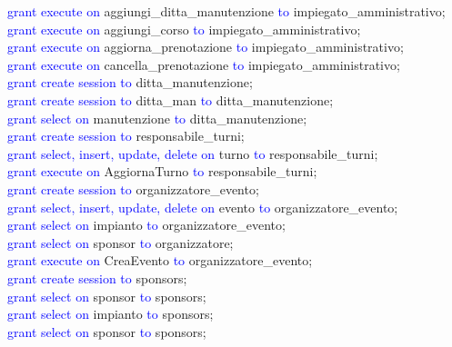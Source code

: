 \documentclass{article}
\begin{document}
\begin{flushleft}
        \textcolor{blue}{grant execute on} aggiungi\_ditta\_manutenzione \textcolor{blue}{to} impiegato\_amministrativo; \\
        \textcolor{blue}{grant execute on} aggiungi\_corso \textcolor{blue}{to} impiegato\_amministrativo; \\
        \textcolor{blue}{grant execute on} aggiorna\_prenotazione \textcolor{blue}{to} impiegato\_amministrativo; \\
        \textcolor{blue}{grant execute on} cancella\_prenotazione \textcolor{blue}{to} impiegato\_amministrativo; \\
        \vspace{2mm}
        \textcolor{blue}{grant create session to} ditta\_manutenzione; \\
        \textcolor{blue}{grant create session to} ditta\_man \textcolor{blue}{to} ditta\_manutenzione; \\
        \textcolor{blue}{grant select on} manutenzione \textcolor{blue}{to} ditta\_manutenzione; \\
        \vspace{2mm}
        \textcolor{blue}{grant create session to} responsabile\_turni; \\
        \textcolor{blue}{grant select, insert, update, delete on} turno \textcolor{blue}{to} responsabile\_turni; \\
        \textcolor{blue}{grant execute on} AggiornaTurno \textcolor{blue}{to} responsabile\_turni; \\
        \vspace{2mm}
        \textcolor{blue}{grant create session to} organizzatore\_evento; \\
        \textcolor{blue}{grant select, insert, update, delete on} evento \textcolor{blue}{to} organizzatore_evento; \\
        \textcolor{blue}{grant select on} impianto \textcolor{blue}{to} organizzatore\_evento; \\
        \textcolor{blue}{grant select on} sponsor \textcolor{blue}{to} organizzatore; \\
        \textcolor{blue}{grant execute on} CreaEvento  \textcolor{blue}{to} organizzatore\_evento; \\
        \vspace{2mm}
        \textcolor{blue}{grant create session to} sponsors; \\
        \textcolor{blue}{grant select on} sponsor \textcolor{blue}{to} sponsors; \\
        \textcolor{blue}{grant select on} impianto \textcolor{blue}{to} sponsors; \\
        \textcolor{blue}{grant select on} sponsor \textcolor{blue}{to} sponsors; \\
    \end{flushleft}
\end{document}
